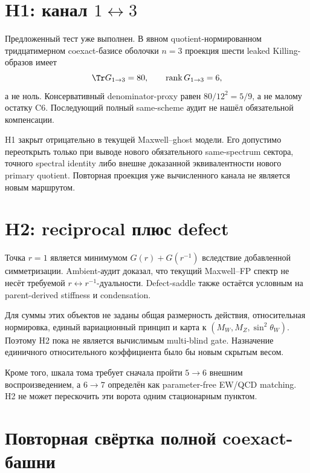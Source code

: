 \section{H1: канал \(1\leftrightarrow3\)}

Предложенный тест уже выполнен. В явном quotient-нормированном
тридцатимерном coexact-базисе оболочки \(n=3\) проекция шести leaked
Killing-образов имеет
\begin{equation}
 \Tr G_{1\to3}=80,
 \qquad
 \operatorname{rank}G_{1\to3}=6,
\end{equation}
а не ноль. Консервативный denominator-proxy равен \(80/12^2=5/9\), а не
малому остатку C6. Последующий полный same-scheme аудит не нашёл
обязательной компенсации.

\begin{nogocriterion}
H1 закрыт отрицательно в текущей Maxwell--ghost модели. Его допустимо
переоткрыть только при выводе нового обязательного same-spectrum сектора,
точного spectral identity либо внешне доказанной эквивалентности нового
primary quotient. Повторная проекция уже вычисленного канала не является
новым маршрутом.
\end{nogocriterion}

\section{H2: reciprocal плюс defect}

Точка \(r=1\) является минимумом
\(G(r)+G(r^{-1})\) вследствие добавленной симметризации. Ambient-аудит
доказал, что текущий Maxwell--FP спектр не несёт требуемой
\(r\leftrightarrow r^{-1}\)-дуальности. Defect-saddle также остаётся
условным на parent-derived stiffness и condensation.

Для суммы этих объектов не заданы общая размерность действия, относительная
нормировка, единый вариационный принцип и карта к
\((M_W,M_Z,\sin^2\theta_W)\). Поэтому H2 пока не является вычислимым
multi-blind gate. Назначение единичного относительного коэффициента было бы
новым скрытым весом.

Кроме того, шкала тома требует сначала пройти \(5\to6\) внешним
воспроизведением, а \(6\to7\) определён как parameter-free EW/QCD matching.
H2 не может перескочить эти ворота одним стационарным пунктом.

\section{Повторная свёртка полной coexact-башни}

